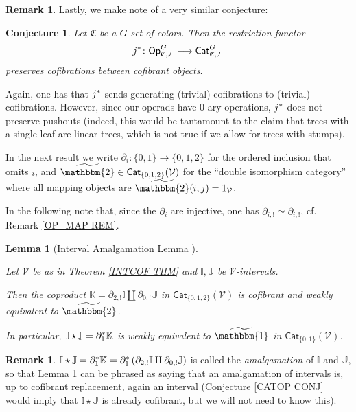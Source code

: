 \documentclass[a4paper,10pt
 ,final
]{article}%
\numberwithin{equation}{section}
\numberwithin{figure}{section}
\newtheorem{lemma}[equation]{Lemma}%
\newtheorem{conjecture}[equation]{Conjecture}%
\theoremstyle{definition} %
\newtheorem{remark}[equation]{Remark}%
\newcommand{\longto}{\longrightarrow}%
\newcommand{\F}{\ensuremath{\mathcal F}}
\newcommand{\V}{\ensuremath{\mathcal V}}
\newcommand{\1}{\ensuremath{\mathbbm 1}}%
\begin{document}
\begin{remark}
Lastly, we make note of a very similar conjecture:
\begin{conjecture}
        Let $\mathfrak C$ be a $G$-set of colors.
        Then the restriction functor
        \[
                j^{\**} \colon \mathsf{Op}_{\mathfrak{C},\F}^G 
                \longto
                \mathsf{Cat}_{\mathfrak{C},\F}^G
        \]
        preserves cofibrations between cofibrant objects.
\end{conjecture}
Again,
one has that $j^{\**}$ 
sends generating (trivial) cofibrations to (trivial) cofibrations.
However, since our operads have $0$-ary operations, %
$j^{\**}$ does not preserve pushouts
(indeed, this would be tantamount to the claim that trees with a single leaf are linear trees, which is not true if we allow for trees with stumps).
\end{remark}



In the next result we write 
$\partial_i \colon \{0,1\} \to \{0,1,2\}$
for the ordered inclusion that omits $i$,
and  
$\widetilde{\mathbbm{2}} \in
\mathsf{Cat}_{\{0,1,2\}}(\V)$
for the ``double isomorphism category''
where all mapping objects are $\widetilde{\mathbbm{2}}(i,j)=1_{\V}$.


In the following note that, since the $\partial_i$
are injective, one has 
$\check{\partial}_{i,!} \simeq \partial_{i,!}$,
cf. Remark \ref{OP_MAP REM}.

\begin{lemma}[Interval Amalgamation Lemma {\cite[Lemma 1.16]{BM13}}]
\label{AMALGLEM LEM}

Let $\V$ be as in Theorem \ref{INTCOF THM} and
$\mathbb{I},\mathbb{J}$ be $\V$-intervals.

Then the coproduct 
$\mathbb{K} = \partial_{2,!} \mathbb{I} \amalg \partial_{0,!} \mathbb{J}$
in $\mathsf{Cat}_{\{0,1,2\}}(\V)$
is cofibrant and weakly equivalent to $\widetilde{\mathbbm{2}}$.

In particular, 
$\mathbb{I} \star \mathbb{J} = \partial_1^{\**}\mathbb{K}$
is weakly equivalent to $\widetilde{\mathbbm{1}}$
in $\mathsf{Cat}_{\{0,1\}}(\V)$.
\end{lemma}


\begin{remark}
$\mathbb{I} \star \mathbb{J} = 
\partial_1^{\**} \mathbb{K} =
\partial_1^{\**} \left(\partial_{2,!} \mathbb{I} \amalg \partial_{0,!} \mathbb{J}\right)$
is called the \emph{amalgamation} of $\mathbb{I}$ and $\mathbb{J}$,
so that Lemma \ref{AMALGLEM LEM} can be phrased as saying that an amalgamation of intervals is,
up to cofibrant replacement, again an interval
(Conjecture \ref{CATOP CONJ} would imply that $\mathbb{I} \star \mathbb{J}$ is already cofibrant, 
but we will not need to know this).
\end{remark}
\end{document}
